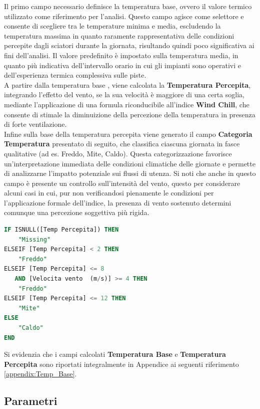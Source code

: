 Il primo campo necessario definisce la temperatura base, ovvero il valore termico utilizzato come riferimento per l’analisi. Questo campo agisce come selettore e consente di scegliere tra le temperature minima e media, escludendo la temperatura massima in quanto raramente rappresentativa delle condizioni percepite dagli sciatori durante la giornata, risultando quindi poco significativa ai fini dell’analisi.
Il valore predefinito è impostato sulla temperatura media, in quanto più indicativa dell’intervallo orario in cui gli impianti sono operativi e dell’esperienza termica complessiva sulle piste.\\

A partire dalla temperatura base , viene calcolata la \textbf{Temperatura Percepita}, integrando l'effetto del vento, se la sua velocità è maggiore di una certa soglia, mediante l'applicazione di una formula riconducibile all'indice \textbf{Wind Chill}, che consente di stimale la diminuizione della percezione della temperatura in presenza di forte ventilazione.\\

Infine sulla base della temperatura percepita viene generato il campo \textbf{Categoria Temperatura} presentato di seguito, che classifica ciascuna giornata in fasce qualitative (ad es. Freddo, Mite, Caldo). Questa categorizzazione favorisce un’interpretazione immediata delle condizioni climatiche delle giornate e permette di analizzarne l’impatto potenziale sui flussi di utenza.
Si noti che anche in questo campo è presente un controllo sull'intensità del vento, questo per considerare alcuni casi in cui, pur non verificandosi pienamente le condizioni per l'applicazione formale dell'indice, la presenza di vento sostenuto determini comunque una percezione soggettiva più rigida.\\


\begin{lstlisting}[language=SQL, caption={Campo calcolato: Categoria Temperatura}]
IF ISNULL([Temp Percepita]) THEN
    "Missing"
ELSEIF [Temp Percepita] < 2 THEN
    "Freddo"
ELSEIF [Temp Percepita] <= 8 
   AND [Velocita vento  (m/s)] >= 4 THEN
    "Freddo"
ELSEIF [Temp Percepita] <= 12 THEN
    "Mite"
ELSE
    "Caldo"
END
\end{lstlisting}

Si evidenzia che i campi calcolati \textbf{Temperatura Base} e \textbf{Temperatura Percepita} sono riportati integralmente in Appendice ai seguenti riferimento \ref{appendix:Temp_Base}. 

\subsection*{Parametri}

